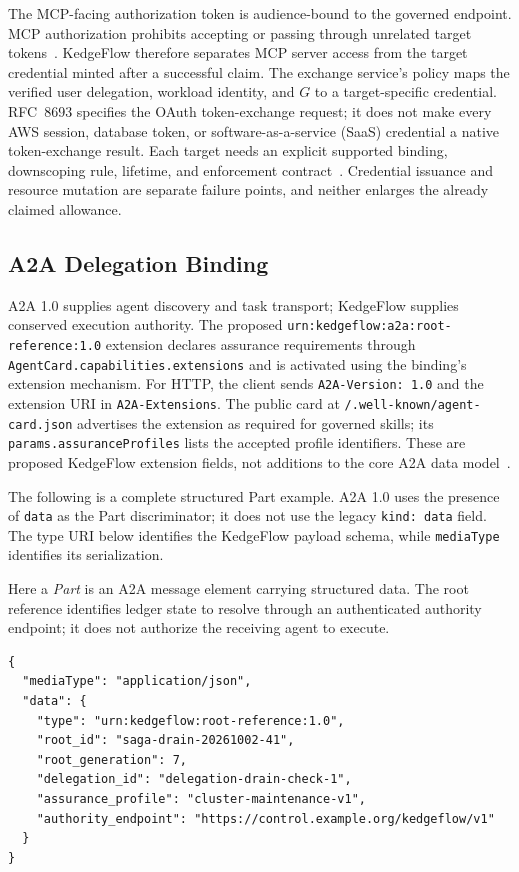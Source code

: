 The MCP-facing authorization token is audience-bound to the governed endpoint. MCP authorization prohibits accepting or passing through unrelated target tokens~\cite{mcpauth2026}. KedgeFlow therefore separates MCP server access from the target credential minted after a successful claim. The exchange service's policy maps the verified user delegation, workload identity, and $G$ to a target-specific credential. RFC~8693 specifies the OAuth token-exchange request; it does not make every AWS session, database token, or software-as-a-service (SaaS) credential a native token-exchange result. Each target needs an explicit supported binding, downscoping rule, lifetime, and enforcement contract~\cite{rfc8693,awssts2026}. Credential issuance and resource mutation are separate failure points, and neither enlarges the already claimed allowance.

\subsection{A2A Delegation Binding}
\label{sec:a2a-delegation}

A2A 1.0 supplies agent discovery and task transport; KedgeFlow supplies conserved execution authority. The proposed \texttt{urn:kedgeflow:a2a:root-reference:1.0} extension declares assurance requirements through \texttt{AgentCard.capabilities.extensions} and is activated using the binding's extension mechanism. For HTTP, the client sends \texttt{A2A-Version: 1.0} and the extension URI in \texttt{A2A-Extensions}. The public card at \texttt{/.well-known/agent-card.json} advertises the extension as required for governed skills; its \texttt{params.assuranceProfiles} lists the accepted profile identifiers. These are proposed KedgeFlow extension fields, not additions to the core A2A data model~\cite{a2a2026}.

The following is a complete structured Part example. A2A 1.0 uses the presence of \texttt{data} as the Part discriminator; it does not use the legacy \texttt{kind: data} field. The type URI below identifies the KedgeFlow payload schema, while \texttt{mediaType} identifies its serialization.

Here a \emph{Part} is an A2A message element carrying structured data. The root reference identifies ledger state to resolve through an authenticated authority endpoint; it does not authorize the receiving agent to execute.

{\small
\begin{verbatim}
{
  "mediaType": "application/json",
  "data": {
    "type": "urn:kedgeflow:root-reference:1.0",
    "root_id": "saga-drain-20261002-41",
    "root_generation": 7,
    "delegation_id": "delegation-drain-check-1",
    "assurance_profile": "cluster-maintenance-v1",
    "authority_endpoint": "https://control.example.org/kedgeflow/v1"
  }
}
\end{verbatim}
}

